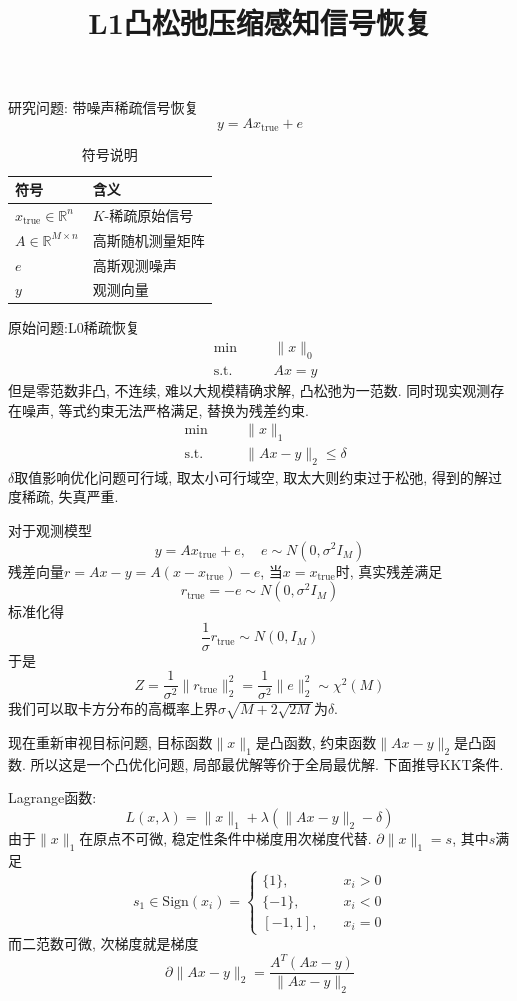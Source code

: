 \documentclass[UTF8]{ctexart}
\title{L1凸松弛压缩感知信号恢复}
\date{}
\theoremstyle{definition}
\theoremstyle{examplestyle}
\theoremstyle{remark}
\begin{document}
研究问题: 带噪声稀疏信号恢复
\[y=Ax_{\text{true}}+e\]
\begin{table}[htbp]
\centering
\begin{tabular}{ll}
\hline
符号 & 含义 \\
\hline
$x_{\text{true}}\in\mathbb{R}^n$ & $K$-稀疏原始信号 \\
$A\in\mathbb{R}^{M\times n}$ & 高斯随机测量矩阵 \\
$e$ & 高斯观测噪声 \\
$y$ & 观测向量 \\
\hline
\end{tabular}
\caption{符号说明}
\label{tab:notation}
\end{table}

原始问题:L0稀疏恢复
\[\begin{aligned}
    &\text{min}\quad &&\|x\|_0\\
    &\text{s.t.}\quad &&Ax=y
\end{aligned}\]
但是零范数非凸, 不连续, 难以大规模精确求解, 凸松弛为一范数. 同时现实观测存在噪声, 等式约束无法严格满足, 替换为残差约束.
\[\begin{aligned}
    &\text{min}\quad &&\|x\|_1\\
    &\text{s.t.}\quad &&\|Ax-y\|_2\le\delta
\end{aligned}\]
$\delta$取值影响优化问题可行域, 取太小可行域空, 取太大则约束过于松弛, 得到的解过度稀疏, 失真严重.

对于观测模型
\[y=Ax_{\text{true}}+e,\quad e\sim N(0,\sigma^2I_M)\]
残差向量$r=Ax-y=A(x-x_{\text{true}})-e$, 当$x=x_\text{true}$时, 真实残差满足
\[r_{\text{true}}=-e\sim N(0,\sigma^2I_M)\]
标准化得
\[\frac{1}{\sigma}r_{\text{true}}\sim N(0,I_M)\]
于是
\[Z=\frac{1}{\sigma^2}\|r_\text{true}\|_2^2=\frac{1}{\sigma^2}\|e\|_2^2\sim\chi^2(M)\]
我们可以取卡方分布的高概率上界$\sigma\sqrt{M+2\sqrt{2M}}$为$\delta$.

现在重新审视目标问题, 目标函数$\|x\|_1$是凸函数, 约束函数$\|Ax-y\|_2$是凸函数. 所以这是一个凸优化问题, 局部最优解等价于全局最优解. 下面推导KKT条件.

Lagrange函数:
\[L(x,\lambda)=\|x\|_1+\lambda(\|Ax-y\|_2-\delta)\]
由于$\|x\|_1$在原点不可微, 稳定性条件中梯度用次梯度代替. $\partial \|x\|_1=s$, 其中$s$满足
\[s_1\in\text{Sign}(x_i)=
\begin{cases}
    \{1\},\quad &x_i>0\\
    \{-1\},\quad &x_i<0\\
    [-1,1],\quad &x_i=0
\end{cases}\]
而二范数可微, 次梯度就是梯度
\[\partial \|Ax-y\|_2=\frac{A^T(Ax-y)}{\|Ax-y\|_2}\]
\end{document}
